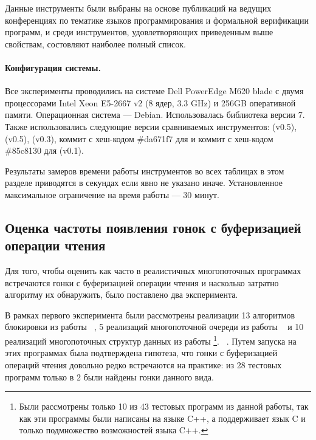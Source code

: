 Данные инструменты были выбраны на основе публикаций 
на ведущих конференциях по тематике языков программирования 
и формальной верификации программ, и среди инструментов, 
удовлетворяющих приведенным выше свойствам, 
состовляют наиболее полный список.

\paragraph{Конфигурация системы.} 

Все эксперименты проводились на системе Dell PowerEdge M620 blade
с двумя процессорами Intel Xeon E5-2667 v2 (8 ядер, 3.3 GHz)
и 256GB оперативной памяти. Операционная система --- Debian.
Использовалась библиотека \LLVM версии 7.
Также использовались следующие версии сравниваемых инструментов: 
\hmc (v0.5), \genmc (v0.5), \Nidhugg (v0.3), 
коммит с хеш-кодом \#da671f7 для \CDSChecker
и коммит с хеш-кодом \#85c8130 для \rmem (v0.1). 

Результаты замеров времени работы инструментов 
во всех таблицах в этом разделе приводятся 
в секундах если явно не указано иначе. 
Установленное максимальное ограничение на время работы --- 30 минут.

\subsection*{Оценка частоты появления гонок с буферизацией операции чтения}

Для того, чтобы оценить как часто в реалистичных многопоточных
программах встречаются гонки с буферизацией операции чтения
и насколько затратно алгоритму \wmc их обнаружить, 
было поставлено два эксперимента. 

В рамках первого эксперимента были рассмотрены 
реализации 13 алгоритмов блокировки из работы%
~\cite{Oberhauser-al:ASPLOS2021},
5 реализаций многопоточной очереди из работы%
~\cite{Kokologiannakis:PLDI2019}
и 10 реализаций многопоточных структур данных из работы%
\footnote{Были рассмотрены только 10 из 43 
тестовых программ из данной работы, 
так как эти программы были написаны на языке C++,
а \genmc поддерживает язык C и только подмножество возможностей языка C++.}. 
~\cite{Ou-Demsky:OOPSLA18}.
Путем запуска \wmc на этих программах была подтверждена гипотеза, 
что гонки с буферизацией операций чтения довольно редко
встречаются на практике: из 28 тестовых программ
только в 2 были найдены гонки данного вида.


